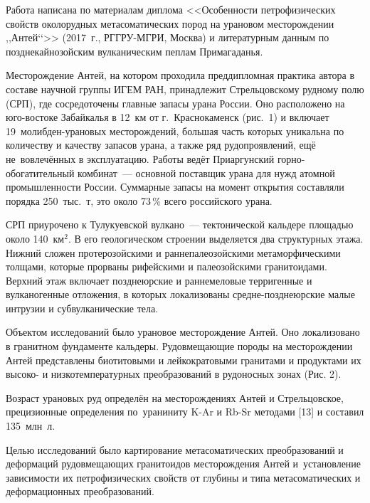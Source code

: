  

\makeProcTitle
{}

Работа написана по материалам диплома <<Особенности петрофизических свойств околорудных метасоматических пород на урановом месторождении ,,Антей‘‘>> (2017~г., РГГРУ-МГРИ, Москва) и литературным данным по позднекайнозойским вулканическим пеплам Примагаданья.



Месторождение Антей, на котором проходила преддипломная практика автора в составе научной группы ИГЕМ РАН, принадлежит Стрельцовскому рудному полю (СРП), где сосредоточены главные запасы урана России. Оно расположено на юго-востоке Забайкалья в 12~км от г.~Краснокаменск (рис.~1) и включает 19~молибден-урановых месторождений, большая часть которых уникальна по количеству и качеству запасов урана, а также ряд рудопроявлений, ещё не~вовлечённых в эксплуатацию. Работы ведёт Приаргунский горно-обогатительный комбинат~--- основной поставщик урана для нужд атомной промышленности России. Суммарные запасы на момент открытия составляли порядка 250~тыс.~т, это около 73\,\% всего российского урана.

СРП приурочено к Тулукуевской вулкано~--- тектонической кальдере площадью около 140~км$^2$. В его геологическом строении выделяется два структурных этажа. Нижний сложен протерозойскими и раннепалеозойскими метаморфическими толщами, которые прорваны рифейскими и палеозойскими гранитоидами. Верхний этаж включает позднеюрские и раннемеловые терригенные и вулканогенные отложения, в которых локализованы средне-позднеюрские малые интрузии и субвулканические тела.

Объектом исследований было урановое месторождение Антей. Оно локализовано в гранитном фундаменте кальдеры. Рудовмещающие породы на месторождении Антей представлены биотитовыми и лейкократовыми гранитами и продуктами их высоко- и низкотемпературных преобразований в рудоносных зонах (Рис. 2).

Возраст урановых руд определён на месторождениях Антей и Стрельцовское, прецизионные определения по~ураниниту K-Ar и Rb-Sr методами [13] и составил 135~млн~л.



Целью исследований было картирование метасоматических преобразований и деформаций рудовмещающих гранитоидов месторождения Антей и~установление зависимости их петрофизических свойств от глубины и типа метасоматических и деформационных преобразований.

